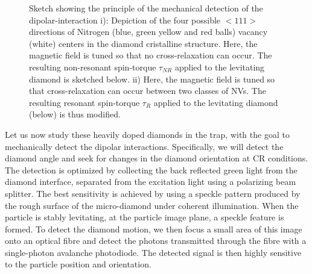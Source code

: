 \documentclass[preprintnumbers,amsmath,amssymb,superscriptaddress,twocolumn,showpacs]{revtex4-1}
\begin{document}
\begin{figure}[!ht]
  \centering {}
  \caption{Sketch showing the principle of the mechanical detection of the dipolar-interaction i): Depiction of the four possible $<111>$ directions of Nitrogen (blue, green yellow and red balls) vacancy (white) centers in the diamond cristalline structure. Here, the magnetic field is tuned so that no cross-relaxation can occur.
The resulting non-resonant spin-torque $\tau_{NR}$ applied to the levitating diamond is sketched below. 
ii) Here, the magnetic field is tuned so that cross-relaxation can occur between two classes of NVs.
The resulting resonant spin-torque $\tau_{R}$ applied to the levitating diamond (below) is thus modified. 
  }\label{principle}
\end{figure}

%

Let us now study these heavily doped diamonds in the trap, with the goal to mechanically detect the dipolar interactions.
Specifically, we will detect the diamond angle and seek for changes in the diamond orientation at CR conditions. The detection is optimized by collecting the back reflected green light from the diamond interface, separated from the excitation light using a polarizing beam splitter. The best sensitivity is achieved by using a speckle pattern produced by the rough surface of the micro-diamond under coherent illumination. When the particle is stably levitating, at the particle image plane, a speckle feature is formed. To detect the diamond motion, we then focus a small area of this image onto an optical fibre and detect the photons transmitted through the fibre with a single-photon avalanche photodiode. The detected signal is then highly sensitive to the particle position and orientation.

\end{document}
